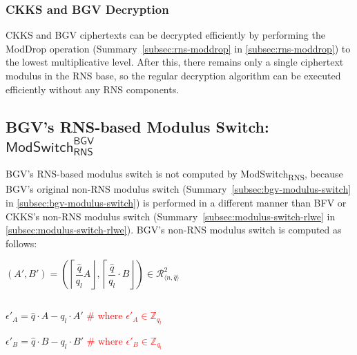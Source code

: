 \begin{comment}
\subsection{RNS-based CKKS Decryption: $\textsf{Dec}_{\textsf{RNS}}^{\textsf{CKKS}}$}
\label{subsec:rns-ckksdec}

RNS-based decryption of CKKS ciphertexts is similar to that of BFV ciphertexts. CKKS's decryption formula is 
\end{comment}

\subsubsection{CKKS and BGV Decryption}
\label{subsubsec:rns-dec-ckks-bgv}

CKKS and BGV ciphertexts can be decrypted efficiently by performing the \textsf{ModDrop} operation (Summary~\ref*{subsec:rns-moddrop} in \autoref{subsec:rns-moddrop}) to the lowest multiplicative level. After this, there remains only a single ciphertext modulus in the RNS base, so the regular decryption algorithm can be executed efficiently without any RNS components. 



\subsection{BGV's RNS-based Modulus Switch: $\textsf{ModSwitch}_{\textsf{RNS}}^{\textsf{BGV}}$}
\label{subsec:rns-modswitch-bgv}

BGV's RNS-based modulus switch is not computed by \textsf{ModSwitch\textsubscript{RNS}}, because BGV's original non-RNS modulus switch (Summary~\ref*{subsec:bgv-modulus-switch} in \autoref{subsec:bgv-modulus-switch}) is performed in a different manner than BFV or CKKS's non-RNS modulus switch (Summary~\ref*{subsec:modulus-switch-rlwe} in \autoref{subsec:modulus-switch-rlwe}). BGV's non-RNS modulus switch is computed as follows: 

$(A', B') = \left(\left\lceil\dfrac{\hat{q}}{q_l} A\right\rfloor, \left\lceil\dfrac{\hat{q}}{q_l}\cdot B\right\rfloor\right) \in \mathcal{R}_{\langle n, \hat{q} \rangle}^2$

$ $

$\epsilon'_A = \hat{q}\cdot A - q_l\cdot A'$ \textcolor{red}{ \# where $\epsilon'_A \in \mathbb{Z}_{q_l}$}

$\epsilon'_B = \hat{q}\cdot B - q_l\cdot B'$ \textcolor{red}{ \# where $\epsilon'_B \in \mathbb{Z}_{q_l}$}


